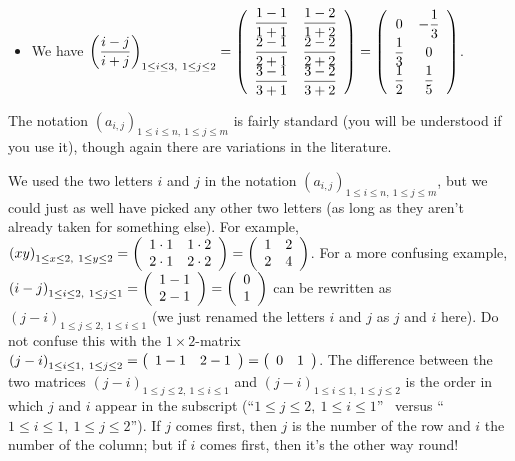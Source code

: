 \documentclass[numbers=enddot,12pt,final,onecolumn,notitlepage]{scrartcl}%
\theoremstyle{definition}
\begin{document}
\begin{itemize}
\item We have $\left(  \dfrac{i-j}{i+j}\right)  _{1\leq i\leq3,\ 1\leq j\leq
2}=\left(
\begin{array}
[c]{cc}%
\dfrac{1-1}{1+1} & \dfrac{1-2}{1+2}\\
\dfrac{2-1}{2+1} & \dfrac{2-2}{2+2}\\
\dfrac{3-1}{3+1} & \dfrac{3-2}{3+2}%
\end{array}
\right)  =\left(
\begin{array}
[c]{cc}%
0 & -\dfrac{1}{3}\\
\dfrac{1}{3} & 0\\
\dfrac{1}{2} & \dfrac{1}{5}%
\end{array}
\right)  $.
\end{itemize}

The notation $\left(  a_{i,j}\right)  _{1\leq i\leq n,\ 1\leq j\leq m}$ is
fairly standard (you will be understood if you use it), though again there are
variations in the literature.

We used the two letters $i$ and $j$ in the notation $\left(  a_{i,j}\right)
_{1\leq i\leq n,\ 1\leq j\leq m}$, but we could just as well have picked any
other two letters (as long as they aren't already taken for something else).
For example, $\left(  xy\right)  _{1\leq x\leq2,\ 1\leq y\leq2}=\left(
\begin{array}
[c]{cc}%
1\cdot1 & 1\cdot2\\
2\cdot1 & 2\cdot2
\end{array}
\right)  =\left(
\begin{array}
[c]{cc}%
1 & 2\\
2 & 4
\end{array}
\right)  $. For a more confusing example, $\left(  i-j\right)  _{1\leq
i\leq2,\ 1\leq j\leq1}=\left(
\begin{array}
[c]{c}%
1-1\\
2-1
\end{array}
\right)  =\left(
\begin{array}
[c]{c}%
0\\
1
\end{array}
\right)  $ can be rewritten as $\left(  j-i\right)  _{1\leq j\leq2,\ 1\leq
i\leq1}$ (we just renamed the letters $i$ and $j$ as $j$ and $i$ here). Do not
confuse this with the $1\times2$-matrix $\left(  j-i\right)  _{1\leq
i\leq1,\ 1\leq j\leq2}=\left(
\begin{array}
[c]{cc}%
1-1 & 2-1
\end{array}
\right)  =\left(
\begin{array}
[c]{cc}%
0 & 1
\end{array}
\right)  $. The difference between the two matrices $\left(  j-i\right)
_{1\leq j\leq2,\ 1\leq i\leq1}$ and $\left(  j-i\right)  _{1\leq
i\leq1,\ 1\leq j\leq2}$ is the order in which $j$ and $i$ appear in the
subscript (\textquotedblleft$1\leq j\leq2,\ 1\leq i\leq1$\textquotedblright%
\ versus \textquotedblleft$1\leq i\leq1,\ 1\leq j\leq2$\textquotedblright). If
$j$ comes first, then $j$ is the number of the row and $i$ the number of the
column; but if $i$ comes first, then it's the other way round!
\end{document}
